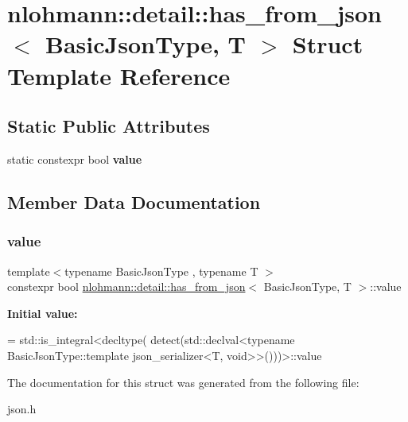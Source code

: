 \hypertarget{structnlohmann_1_1detail_1_1has__from__json}{}\section{nlohmann\+:\+:detail\+:\+:has\+\_\+from\+\_\+json$<$ Basic\+Json\+Type, T $>$ Struct Template Reference}
\label{structnlohmann_1_1detail_1_1has__from__json}
\subsection*{Static Public Attributes}
\begin{DoxyCompactItemize}
\item 
static constexpr bool {\bfseries value}
\end{DoxyCompactItemize}


\subsection{Member Data Documentation}
\mbox{\label{structnlohmann_1_1detail_1_1has__from__json_a16701d806343c58ae7e884024dd14955}} 
\subsubsection{\texorpdfstring{value}{value}}
{\footnotesize\ttfamily template$<$typename Basic\+Json\+Type , typename T $>$ \\
constexpr bool \hyperlink{structnlohmann_1_1detail_1_1has__from__json}{nlohmann\+::detail\+::has\+\_\+from\+\_\+json}$<$ Basic\+Json\+Type, T $>$\+::value\hspace{0.3cm}{\ttfamily [static]}}

{\bfseries Initial value\+:}
\begin{DoxyCode}
= std::is\_integral<decltype(
                                      detect(std::declval<\textcolor{keyword}{typename} BasicJsonType::template 
      json\_serializer<T, void>>()))>::value
\end{DoxyCode}


The documentation for this struct was generated from the following file\+:\begin{DoxyCompactItemize}
\item 
json.\+h\end{DoxyCompactItemize}
